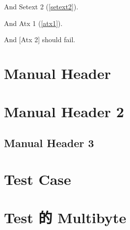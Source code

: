And Setext 2 (\autoref{setext2}).

And Atx 1 (\autoref{atx1}).

And [Atx 2] should fail.

\chapter{Manual Header}
\label{label}

\chapter{Manual Header 2}
\label{label2}

\section{Manual Header 3}
\label{label3}

\chapter{Test Case}
\label{test}

\chapter{Test 的 Multibyte}
\label{test的multibyte}




